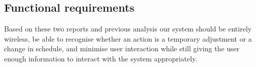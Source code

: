 \subsection{Functional requirements}
Based on these two reports and previous analysis our system should be entirely wireless, be able to recognise whether an action is a temporary adjustment or a change in schedule, and minimise user interaction while still giving the user enough information to interact with the system appropriately.
